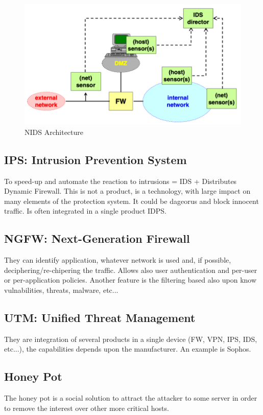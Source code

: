 \documentclass[12pt]{article}
\begin{document}
\begin{figure}[H]
   \centering
   \includegraphics[width=\linewidth]{images/NIDS_arch.png}
   \caption{NIDS Architecture}
   \label{fig:NIDS_arch}
\end{figure}

\subsection{IPS: Intrusion Prevention System}
To speed-up and automate the reaction to intrusions = IDS + Distributes Dynamic Firewall. This is not a product, is a technology, with large impact on many elements of the protection system. It could be dageorus and block innocent traffic. Is often integrated in a single product IDPS.

\subsection{NGFW: Next-Generation Firewall}
They can identify application, whatever network is used and, if possible, deciphering/re-chipering the traffic. Allows also user authentication and per-user or per-application policies. Another feature is the filtering based also upon know vulnabilities, threats, malware, etc...

\subsection{UTM: Unified Threat Management}
They are integration of several products in a single device (FW, VPN, IPS, IDS, etc...), the capabilities depends upon the manufacturer. An example is Sophos.

\subsection{Honey Pot}
The honey pot is a social solution to attract the attacker to some server in order to remove the interest over other more critical hosts.
\end{document}
